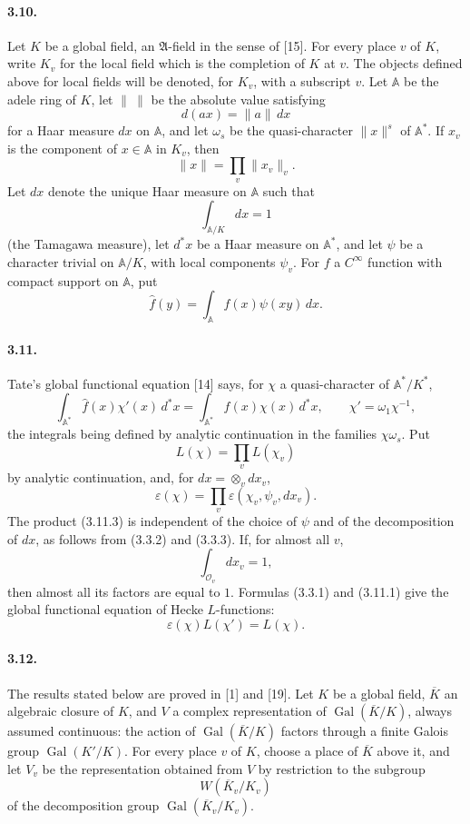 \documentclass[10pt]{article}
\newcommand{\Gal}{\operatorname{Gal}}
\begin{document}
\paragraph{3.10.} Let \(K\) be a global field, an \(\mathfrak A\)-field in the sense of [15]. For every place \(v\) of \(K\), write \(K_v\) for the local field which is the completion of \(K\) at \(v\). The objects defined above for local fields will be denoted, for \(K_v\), with a subscript \(v\). Let \(\mathbb A\) be the adele ring of \(K\), let \(\|\ \|\) be the absolute value satisfying
\[
d(ax)=\|a\|\,dx
\]
for a Haar measure \(dx\) on \(\mathbb A\), and let \(\omega_s\) be the quasi-character \(\|x\|^s\) of \(\mathbb A^*\). If \(x_v\) is the component of \(x\in\mathbb A\) in \(K_v\), then
\[
\|x\|=\prod_v\|x_v\|_v.
\]
Let \(dx\) denote the unique Haar measure on \(\mathbb A\) such that
\[
\int_{\mathbb A/K}dx=1
\]
(the Tamagawa measure), let \(d^*x\) be a Haar measure on \(\mathbb A^*\), and let \(\psi\) be a character trivial on \(\mathbb A/K\), with local components \(\psi_v\). For \(f\) a \(C^\infty\) function with compact support on \(\mathbb A\), put
\[
\widehat f(y)=\int_{\mathbb A}f(x)\psi(xy)\,dx.
\]

\paragraph{3.11.} Tate's global functional equation [14] says, for \(\chi\) a quasi-character of \(\mathbb A^*/K^*\),
\[
\tag{3.11.1}
\int_{\mathbb A^*}\widehat f(x)\chi'(x)\,d^*x
=
\int_{\mathbb A^*}f(x)\chi(x)\,d^*x,
\qquad
\chi'=\omega_1\chi^{-1},
\]
the integrals being defined by analytic continuation in the families \(\chi\omega_s\). Put
\[
\tag{3.11.2}
L(\chi)=\prod_vL(\chi_v)
\]
by analytic continuation, and, for \(dx=\otimes_vdx_v\),
\[
\tag{3.11.3}
\varepsilon(\chi)=\prod_v\varepsilon(\chi_v,\psi_v,dx_v).
\]
The product (3.11.3) is independent of the choice of \(\psi\) and of the decomposition of \(dx\), as follows from (3.3.2) and (3.3.3). If, for almost all \(v\),
\[
\int_{\mathcal O_v}dx_v=1,
\]
then almost all its factors are equal to \(1\). Formulas (3.3.1) and (3.11.1) give the global functional equation of Hecke \(L\)-functions:
\[
\tag{3.11.4}
\varepsilon(\chi)L(\chi')=L(\chi).
\]

\paragraph{3.12.} The results stated below are proved in [1] and [19]. Let \(K\) be a global field, \(\overline K\) an algebraic closure of \(K\), and \(V\) a complex representation of \(\Gal(\overline K/K)\), always assumed continuous: the action of \(\Gal(\overline K/K)\) factors through a finite Galois group \(\Gal(K'/K)\). For every place \(v\) of \(K\), choose a place of \(\overline K\) above it, and let \(V_v\) be the representation obtained from \(V\) by restriction to the subgroup
\[
W(\overline K_v/K_v)
\]
of the decomposition group \(\Gal(\overline K_v/K_v)\).
\end{document}
